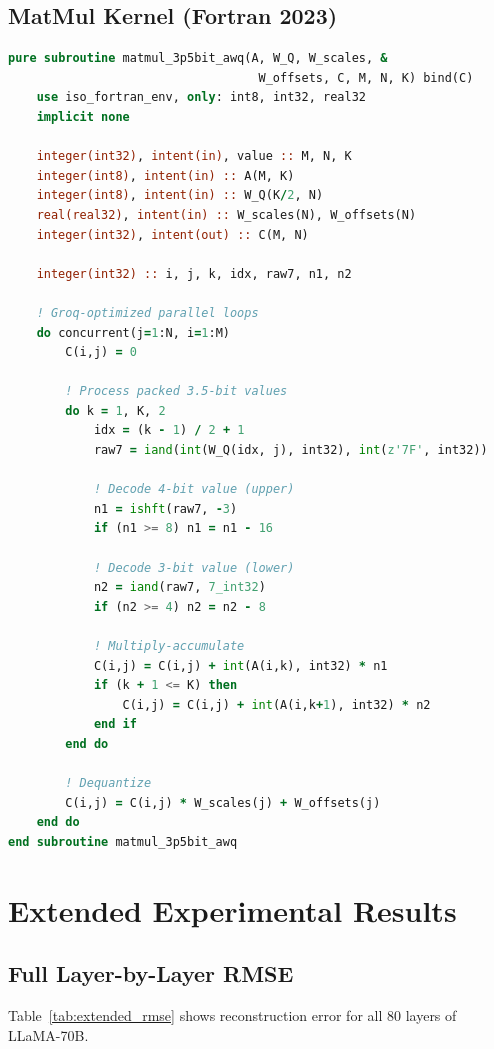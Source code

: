 \documentclass[10pt]{article}
\begin{document}
\subsection{MatMul Kernel (Fortran 2023)}

\begin{lstlisting}[language=Fortran, caption={3.5-bit Matrix Multiplication Kernel}]
pure subroutine matmul_3p5bit_awq(A, W_Q, W_scales, &
                                   W_offsets, C, M, N, K) bind(C)
    use iso_fortran_env, only: int8, int32, real32
    implicit none

    integer(int32), intent(in), value :: M, N, K
    integer(int8), intent(in) :: A(M, K)
    integer(int8), intent(in) :: W_Q(K/2, N)
    real(real32), intent(in) :: W_scales(N), W_offsets(N)
    integer(int32), intent(out) :: C(M, N)

    integer(int32) :: i, j, k, idx, raw7, n1, n2

    ! Groq-optimized parallel loops
    do concurrent(j=1:N, i=1:M)
        C(i,j) = 0

        ! Process packed 3.5-bit values
        do k = 1, K, 2
            idx = (k - 1) / 2 + 1
            raw7 = iand(int(W_Q(idx, j), int32), int(z'7F', int32))

            ! Decode 4-bit value (upper)
            n1 = ishft(raw7, -3)
            if (n1 >= 8) n1 = n1 - 16

            ! Decode 3-bit value (lower)
            n2 = iand(raw7, 7_int32)
            if (n2 >= 4) n2 = n2 - 8

            ! Multiply-accumulate
            C(i,j) = C(i,j) + int(A(i,k), int32) * n1
            if (k + 1 <= K) then
                C(i,j) = C(i,j) + int(A(i,k+1), int32) * n2
            end if
        end do

        ! Dequantize
        C(i,j) = C(i,j) * W_scales(j) + W_offsets(j)
    end do
end subroutine matmul_3p5bit_awq
\end{lstlisting}

\section{Extended Experimental Results}

\subsection{Full Layer-by-Layer RMSE}

Table~\ref{tab:extended_rmse} shows reconstruction error for all 80 layers of LLaMA-70B.
\end{document}
